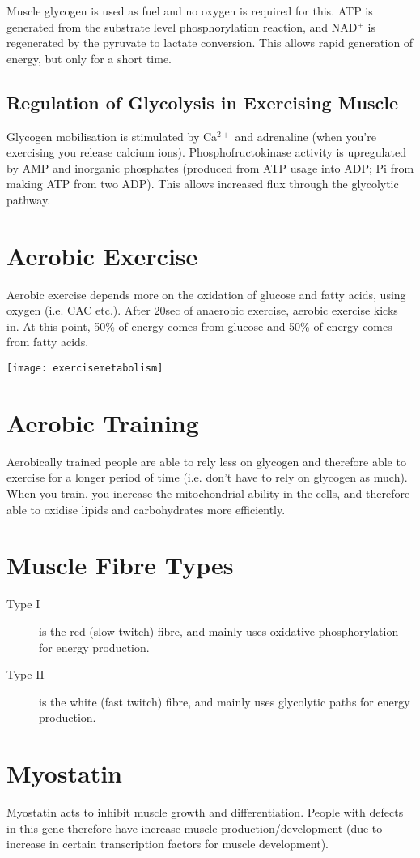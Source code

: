 Muscle glycogen is used as fuel and no oxygen is required for this.
ATP is generated from the substrate level phosphorylation reaction, and NAD$^+$ is regenerated by the pyruvate to lactate conversion.
This allows rapid generation of energy, but only for a short time.

\subsection{Regulation of Glycolysis in Exercising Muscle}

Glycogen mobilisation is stimulated by Ca$^{2+}$ and adrenaline (when you're exercising you release calcium ions).
Phosphofructokinase activity is upregulated by AMP and inorganic phosphates (produced from ATP usage into ADP; Pi from making ATP from two ADP).
This allows increased flux through the glycolytic pathway.

\section{Aerobic Exercise}

Aerobic exercise depends more on the oxidation of glucose and fatty acids, using oxygen (i.e. CAC etc.).
After 20sec of anaerobic exercise, aerobic exercise kicks in.
At this point, 50\% of energy comes from glucose and 50\% of energy comes from fatty acids.

\begin{center}
\texttt{[image: exercisemetabolism]}
\end{center}

\section{Aerobic Training}

Aerobically trained people are able to rely less on glycogen and therefore able to exercise for a longer period of time (i.e. don't have to rely on glycogen as much).
When you train, you increase the mitochondrial ability in the cells, and therefore able to oxidise lipids and carbohydrates more efficiently.

\section{Muscle Fibre Types}

\begin{description}
\item[Type I] is the red (slow twitch) fibre, and mainly uses oxidative phosphorylation for energy production.
\item[Type II] is the white (fast twitch) fibre, and mainly uses glycolytic paths for energy production.
\end{description}

\section{Myostatin}

Myostatin acts to inhibit muscle growth and differentiation.
People with defects in this gene therefore have increase muscle production/development (due to increase in certain transcription factors for muscle development).

